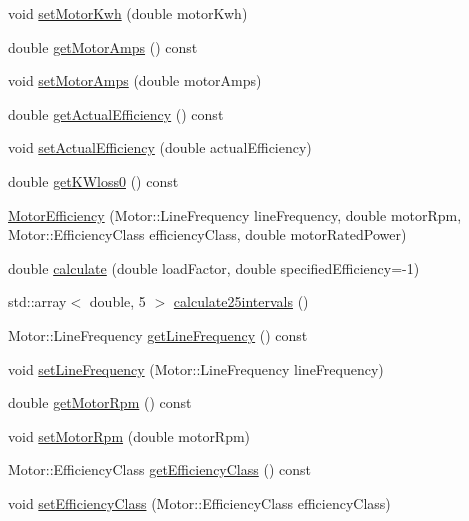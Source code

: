 \begin{DoxyCompactItemize}
\item 
void \hyperlink{class_motor_efficiency_ab1c7507bac259565e43a6777d079148b}{set\+Motor\+Kwh} (double motor\+Kwh)
\item 
double \hyperlink{class_motor_efficiency_a955906509a4b49274b35c1b119c4a4b4}{get\+Motor\+Amps} () const
\item 
void \hyperlink{class_motor_efficiency_ac86aa8d6162e63eb440e07e557534c74}{set\+Motor\+Amps} (double motor\+Amps)
\item 
double \hyperlink{class_motor_efficiency_ae40031307b8631cf40df1c4069069dc0}{get\+Actual\+Efficiency} () const
\item 
void \hyperlink{class_motor_efficiency_a7a5ad8d01fdc0a3bf93d952752487496}{set\+Actual\+Efficiency} (double actual\+Efficiency)
\item 
double \hyperlink{class_motor_efficiency_a47398ac8203f5b79a0ca435673a4bc16}{get\+K\+Wloss0} () const
\item 
\hyperlink{class_motor_efficiency_a04625cbf2e8e6fea0fb1d005bd36808c}{Motor\+Efficiency} (Motor\+::\+Line\+Frequency line\+Frequency, double motor\+Rpm, Motor\+::\+Efficiency\+Class efficiency\+Class, double motor\+Rated\+Power)
\item 
double \hyperlink{class_motor_efficiency_ace29950c3155ea4befd7961e28376e23}{calculate} (double load\+Factor, double specified\+Efficiency=-\/1)
\item 
std\+::array$<$ double, 5 $>$ \hyperlink{class_motor_efficiency_ac2bd043e7da0bea7e78b31528d1951a9}{calculate25intervals} ()
\item 
Motor\+::\+Line\+Frequency \hyperlink{class_motor_efficiency_a3cc0ed606154a04d035399e05d1cb02a}{get\+Line\+Frequency} () const
\item 
void \hyperlink{class_motor_efficiency_a993b09941d330d3a46e0d72bd6dc65bb}{set\+Line\+Frequency} (Motor\+::\+Line\+Frequency line\+Frequency)
\item 
double \hyperlink{class_motor_efficiency_ab29655f487e90a73246be6e9bc67c36a}{get\+Motor\+Rpm} () const
\item 
void \hyperlink{class_motor_efficiency_a2c4ddf9f2f3e44c098dad91a0ddbaf21}{set\+Motor\+Rpm} (double motor\+Rpm)
\item 
Motor\+::\+Efficiency\+Class \hyperlink{class_motor_efficiency_a9eb7d5c2fc598f655c1a3d12790e4d17}{get\+Efficiency\+Class} () const
\item 
void \hyperlink{class_motor_efficiency_a1ff4790d01bf2e65bd7bce2edc98d0c5}{set\+Efficiency\+Class} (Motor\+::\+Efficiency\+Class efficiency\+Class)

\end{DoxyCompactItemize}
